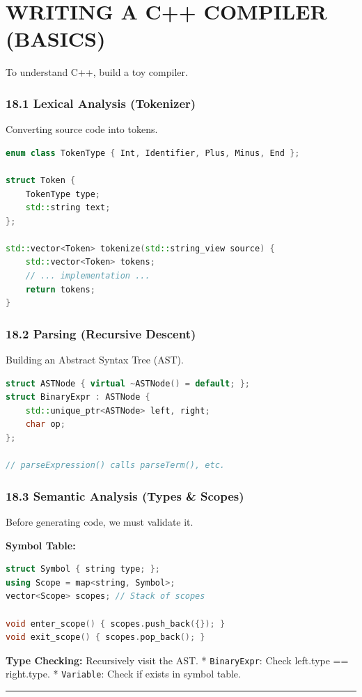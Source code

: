 \hypertarget{writing-a-c-compiler-basics}{%
\chapter{WRITING A C++ COMPILER
(BASICS)}\label{writing-a-c-compiler-basics}}

To understand C++, build a toy compiler.

\hypertarget{lexical-analysis-tokenizer}{%
\subsection{18.1 Lexical Analysis
(Tokenizer)}\label{lexical-analysis-tokenizer}}

Converting source code into tokens.

\begin{lstlisting}[language={C++}]
enum class TokenType { Int, Identifier, Plus, Minus, End };

struct Token {
    TokenType type;
    std::string text;
};

std::vector<Token> tokenize(std::string_view source) {
    std::vector<Token> tokens;
    // ... implementation ...
    return tokens;
}
\end{lstlisting}

\hypertarget{parsing-recursive-descent}{%
\subsection{18.2 Parsing (Recursive
Descent)}\label{parsing-recursive-descent}}

Building an Abstract Syntax Tree (AST).

\begin{lstlisting}[language={C++}]
struct ASTNode { virtual ~ASTNode() = default; };
struct BinaryExpr : ASTNode {
    std::unique_ptr<ASTNode> left, right;
    char op;
};

// parseExpression() calls parseTerm(), etc.
\end{lstlisting}

\hypertarget{semantic-analysis-types-scopes}{%
\subsection{18.3 Semantic Analysis (Types \&
Scopes)}\label{semantic-analysis-types-scopes}}

Before generating code, we must validate it.

\textbf{Symbol Table:}

\begin{lstlisting}[language={C++}]
struct Symbol { string type; };
using Scope = map<string, Symbol>;
vector<Scope> scopes; // Stack of scopes

void enter_scope() { scopes.push_back({}); }
void exit_scope() { scopes.pop_back(); }
\end{lstlisting}

\textbf{Type Checking:} Recursively visit the AST. *
\passthrough{\lstinline!BinaryExpr!}: Check left.type == right.type. *
\passthrough{\lstinline!Variable!}: Check if exists in symbol table.

\begin{center}\rule{0.5\linewidth}{0.5pt}\end{center}
